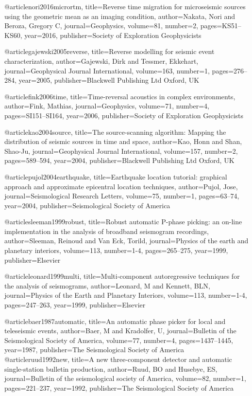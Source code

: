 @article{nori2016micrortm,
  title={Reverse time migration for microseismic sources using the geometric mean as an imaging condition},
  author={Nakata, Nori and Beroza, Gregory C},
  journal={Geophysics},
  volume={81},
  number={2},
  pages={KS51--KS60},
  year={2016},
  publisher={Society of Exploration Geophysicists}
}


@article{gajewski2005reverse,
  title={Reverse modelling for seismic event characterization},
  author={Gajewski, Dirk and Tessmer, Ekkehart},
  journal={Geophysical Journal International},
  volume={163},
  number={1},
  pages={276--284},
  year={2005},
  publisher={Blackwell Publishing Ltd Oxford, UK}
}


@article{fink2006time,
  title={Time-reversal acoustics in complex environments},
  author={Fink, Mathias},
  journal={Geophysics},
  volume={71},
  number={4},
  pages={SI151--SI164},
  year={2006},
  publisher={Society of Exploration Geophysicists}
}

@article{kao2004source,
  title={The source-scanning algorithm: Mapping the distribution of seismic sources in time and space},
  author={Kao, Honn and Shan, Shao-Ju},
  journal={Geophysical Journal International},
  volume={157},
  number={2},
  pages={589--594},
  year={2004},
  publisher={Blackwell Publishing Ltd Oxford, UK}
}

@article{pujol2004earthquake,
  title={Earthquake location tutorial: graphical approach and approximate epicentral location techniques},
  author={Pujol, Jose},
  journal={Seismological Research Letters},
  volume={75},
  number={1},
  pages={63--74},
  year={2004},
  publisher={Seismological Society of America}
}


@article{sleeman1999robust,
  title={Robust automatic P-phase picking: an on-line implementation in the analysis of broadband seismogram recordings},
  author={Sleeman, Reinoud and Van Eck, Torild},
  journal={Physics of the earth and planetary interiors},
  volume={113},
  number={1-4},
  pages={265--275},
  year={1999},
  publisher={Elsevier}
}

@article{leonard1999multi,
  title={Multi-component autoregressive techniques for the analysis of seismograms},
  author={Leonard, M and Kennett, BLN},
  journal={Physics of the Earth and Planetary Interiors},
  volume={113},
  number={1-4},
  pages={247--263},
  year={1999},
  publisher={Elsevier}
}

@article{baer1987automatic,
  title={An automatic phase picker for local and teleseismic events},
  author={Baer, M and Kradolfer, U},
  journal={Bulletin of the Seismological Society of America},
  volume={77},
  number={4},
  pages={1437--1445},
  year={1987},
  publisher={The Seismological Society of America}
}
@article{ruud1992new,
  title={A new three-component detector and automatic single-station bulletin production},
  author={Ruud, BO and Husebye, ES},
  journal={Bulletin of the seismological society of America},
  volume={82},
  number={1},
  pages={221--237},
  year={1992},
  publisher={The Seismological Society of America}
}

